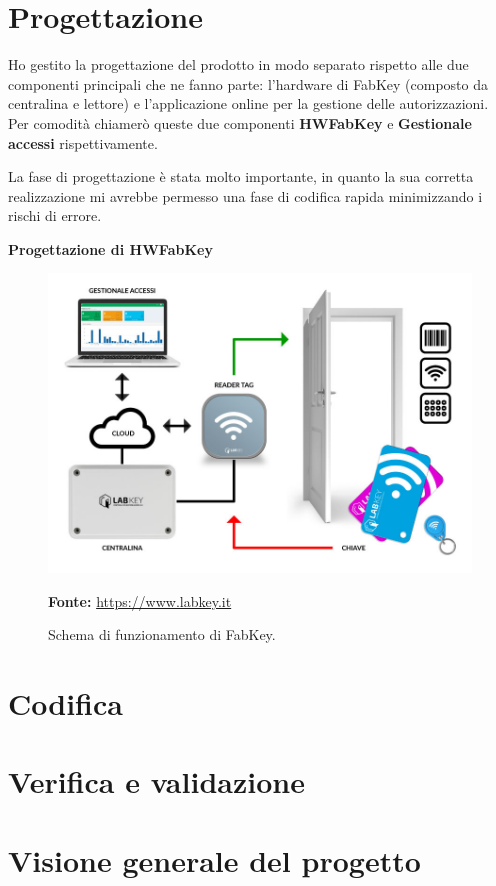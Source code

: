 \section{Progettazione}
Ho gestito la progettazione del prodotto in modo separato rispetto alle due componenti principali che ne fanno parte: l'hardware di FabKey (composto da centralina e lettore) e l'applicazione online per la gestione delle autorizzazioni. Per comodità chiamerò queste due componenti \textbf{HWFabKey} e \textbf{Gestionale accessi} rispettivamente.

\medskip

La fase di progettazione è stata molto importante, in quanto la sua corretta realizzazione mi avrebbe permesso una fase di codifica rapida minimizzando i rischi di errore.

\bigskip

\textbf{Progettazione di HWFabKey}

\begin{figure}[H]
	\begin{center}
	\includegraphics[scale=0.4]{immagini/schema_labkey.jpg}
	\caption{Schema di funzionamento di FabKey.}
	\small{\textbf{Fonte:} \url{https://www.labkey.it}}
	\end{center}
\end{figure}


\section{Codifica}

\section{Verifica e validazione}

\section{Visione generale del progetto}